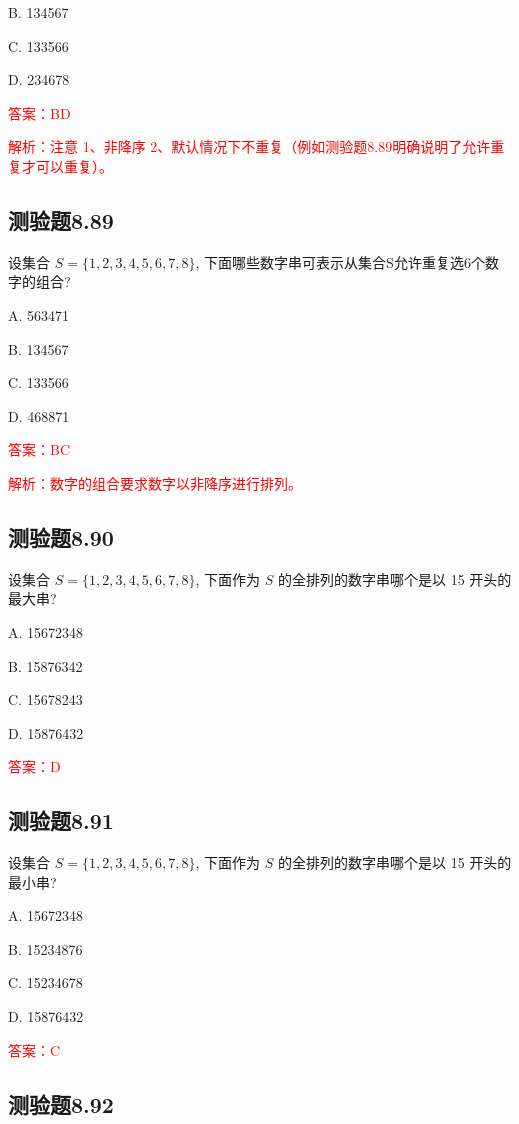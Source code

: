 \documentclass[UTF8, heading=true]{ctexart}
\begin{document}
B. 134567

C. 133566

D. 234678

\textcolor{red}{答案：BD}

\textcolor{red}{解析：注意 1、非降序 2、默认情况下不重复（例如测验题8.89明确说明了允许重复才可以重复）。}

\subsection{测验题8.89}

设集合 $S=\{1,2,3,4,5,6,7,8\}$, 下面哪些数字串可表示从集合S允许重复选6个数字的组合?

A. 563471

B. 134567

C. 133566

D. 468871

\textcolor{red}{答案：BC}

\textcolor{red}{解析：数字的组合要求数字以非降序进行排列。}



\subsection{测验题8.90}

设集合 $S=\{1,2,3,4,5,6,7,8\}$, 下面作为 $S$ 的全排列的数字串哪个是以 15 开头的最大串?

A. 15672348

B. 15876342

C. 15678243

D. 15876432

\textcolor{red}{答案：D}

\subsection{测验题8.91}

设集合 $S=\{1,2,3,4,5,6,7,8\}$, 下面作为 $S$ 的全排列的数字串哪个是以 15 开头的最小串?

A. 15672348

B. 15234876

C. 15234678

D. 15876432

\textcolor{red}{答案：C}

\subsection{测验题8.92}
\end{document}
